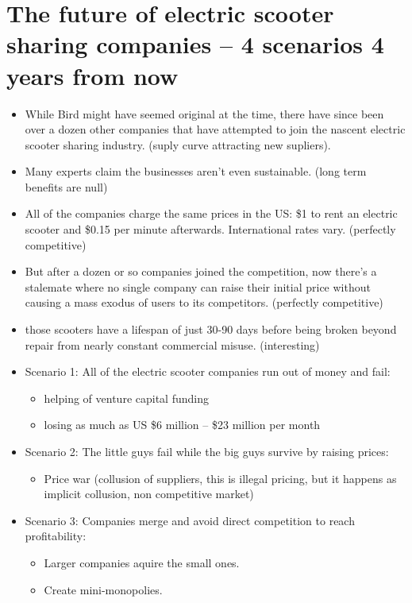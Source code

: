 \documentclass{article}
\begin{document}
\section{The future of electric scooter sharing companies – 4 scenarios 4 years from now}
\begin{itemize}
    \item While Bird might have seemed original at the time, there have since been over a dozen other companies that have attempted to join the nascent electric scooter sharing industry. (suply curve attracting new supliers).
    \item Many experts claim the businesses aren’t even sustainable. (long term benefits are null)
    \item All of the companies charge the same prices in the US: \$1 to rent an electric scooter and \$0.15 per minute afterwards. International rates vary. (perfectly competitive)
    \item But after a dozen or so companies joined the competition, now there’s a stalemate where no single company can raise their initial price without causing a mass exodus of users to its competitors. (perfectly competitive)
    \item those scooters have a lifespan of just 30-90 days before being broken beyond repair from nearly constant commercial misuse. (interesting)
    \item Scenario 1: All of the electric scooter companies run out of money and fail:
        \begin{itemize}
            \item helping of venture capital funding 
            \item losing as much as US \$6 million – \$23 million per month 
        \end{itemize}
    
    \item Scenario 2: The little guys fail while the big guys survive by raising prices: 
        \begin{itemize}
            \item Price war (collusion of suppliers, this is illegal pricing, but it happens as implicit collusion, non competitive market) 
        \end{itemize}
    
    \item Scenario 3: Companies merge and avoid direct competition to reach profitability:
        \begin{itemize}
            \item Larger companies aquire the small ones. 
            \item Create mini-monopolies.
        \end{itemize}
    

\end{itemize}
\end{document}
